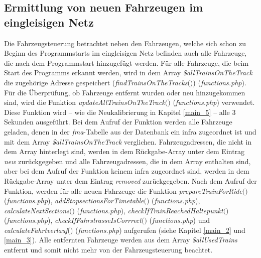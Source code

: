 \subsection{Ermittlung von neuen Fahrzeugen im eingleisigen Netz} \label{main_6}
Die Fahrzeugsteuerung betrachtet neben den Fahrzeugen, welche sich schon zu Beginn des Programmstarts im eingleisigen Netz befinden auch alle Fahrzeuge, die nach dem Programmstart hinzugefügt werden. Für alle Fahrzeuge, die beim Start des Programms erkannt werden, wird in dem Array \textit{\$allTrainsOnTheTrack} die zugehörige Adresse gespeichert (\textit{find\-Trains\-On\-The\-Tracks$($$)$}) (\textit{functions.php}). Für die Überprüfung, ob Fahrzeuge entfernt wurden oder neu hinzugekommen sind, wird die Funktion \textit{up\-date\-All\-Trains\-On\-The\-Track$($$)$} \mbox{(\textit{functions.php})} verwendet. Diese Funktion wird -- wie die Neukalibrierung in Kapitel \ref{main_5} -- alle 3 Sekunden ausgeführt. Bei dem Aufruf der Funktion werden alle Fahrzeuge geladen, denen in der \textit{fma}-Tabelle aus der Datenbank ein \ac{infra} zugeordnet ist und mit dem Array \textit{\$allTrainsOnTheTrack} verglichen. Fahrzeugadressen, die nicht in dem Array hinterlegt sind, werden in dem Rückgabe-Array unter dem Eintrag \textit{new} zurückgegeben und alle Fahrzeugadressen, die in dem Array enthalten sind, aber bei dem Aufruf der Funktion keinem \ac{infra} zugeordnet sind, werden in dem Rückgabe-Array unter dem Eintrag \textit{removed} zurückgegeben. Nach dem Aufruf der Funktion, werden für alle neuen Fahrzeuge die Funktion \textit{pre\-pare\-Train\-For\-Ride$($$)$} (\textit{func\-tions.php}), \textit{add\-Stop\-sec\-tions\-For\-Time\-table$($$)$} (\textit{func\-tions.php}), \textit{cal\-culate\-Next\-Sec\-tions$($$)$} (\textit{func\-tions.php}), \textit{check\-If\-Train\-Reached\-Halte\-punkt$($$)$} (\textit{func\-tions.php}), \textit{check\-If\-Fahr\-strasse\-Is\-Corrrect$($$)$} (\textit{func\-tions.php}) und \textit{calculate\-Fahrt\-ver\-lauf$($$)$} (\textit{func\-tions\-.php}) aufgerufen (siehe Kapitel \ref{main_2} und \ref{main_3}). Alle entfernten Fahrzeuge werden aus dem Array \textit{\$allUsedTrains} entfernt und somit nicht mehr von der Fahrzeugsteuerung beachtet. 
